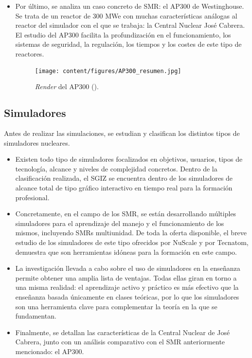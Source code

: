 \documentclass[a4paper, 11pt, spanish, twoside]{article}
\begin{document}
\begin{itemize}
    \item Por último, se analiza un caso concreto de SMR: el AP300 de Westinghouse. Se trata de un reactor de 300 MWe con muchas características análogas al reactor del simulador con el que se trabaja: la Central Nuclear José Cabrera. El estudio del AP300 facilita la profundización en el funcionamiento, los sistemas de seguridad, la regulación, los tiempos y los costes de este tipo de reactores.
    \begin{figure}[h!]
        \centering
        \texttt{[image: content/figures/AP300\_resumen.jpg]}
        \caption{\textit{Render} del AP300 (\cite{ap300_westinghouse}).}
        \label{fig:ap300_westinghouse_resumen}
    \end{figure}
\end{itemize}

\subsection*{Simuladores}

Antes de realizar las simulaciones, se estudian y clasifican los distintos tipos de simuladores nucleares.

\begin{itemize}
    \item Existen todo tipo de simuladores focalizados en objetivos, usuarios, tipos de tecnología, alcance y niveles de complejidad concretos. Dentro de la clasificación realizada, el SGIZ se encuentra dentro de los simuladores de alcance total de tipo gráfico interactivo en tiempo real para la formación profesional.
    \item Concretamente, en el campo de los SMR, se están desarrollando múltiples simuladores para el aprendizaje del manejo y el funcionamiento de los mismos, incluyendo SMRs multiunidad. De toda la oferta disponible, el breve estudio de los simuladores de este tipo ofrecidos por NuScale y por Tecnatom, demuestra que son herramientas idóneas para la formación en este campo.
    \item La investigación llevada a cabo sobre el uso de simuladores en la enseñanza permite obtener una amplia lista de ventajas. Todas ellas giran en torno a una misma realidad: el aprendizaje activo y práctico es más efectivo que la enseñanza basada únicamente en clases teóricas, por lo que los simuladores son una herramienta clave para complementar la teoría en la que se fundamentan.
    \item Finalmente, se detallan las características de la Central Nuclear de José Cabrera, junto con un análisis comparativo con el SMR anteriormente mencionado: el AP300.
\end{itemize}
\end{document}
